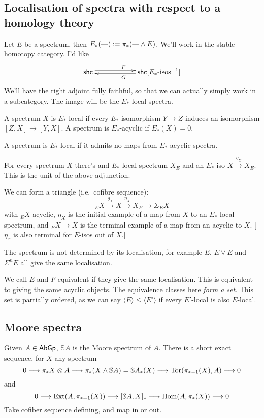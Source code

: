 \documentclass[11pt]{article}
\newcommand{\KanSemResponse}[1]
{
\thispagestyle{fancy}
\section{#1}
}
\begin{document}
\begin{MarkusLocalisationPractice}
\KanSemResponse
{Localisation of spectra with respect to a homology theory}
Let $E$ be a spectrum, then $E_*(\textup{---}):=\pi_*(\textup{---}\wedge E)$. We'll work in the stable homotopy category. I'd like
\[\xymatrix@R=.3cm@C=2cm{
\mathsf{shc}  \ar@<.6ex>[r]^{F}&
\mathsf{shc}[\textup{$E_*$-isos}^{-1}] \ar@<.4ex>[l]^{G}\\
}\]
We'll have the right adjoint fully faithful, so that we can actually simply work in a subcategory. The image will be the $E_*$-local spectra.
\begin{defn*}
A spectrum $X$ is $E_*$-local if every $E_*$-isomorphism $Y\to Z$ induces an isomorphism $[Z,X]\to[Y,X]$. A spectrum is $E_*$-acyclic if $E_*(X)=0$.
\end{defn*}
\begin{lem*}
A spectrum is $E_*$-local if it admits no maps from $E_*$-acyclic spectra.
\end{lem*}
\begin{thm*}
For every spectrum $X$ there's and $E_*$-local spectrum $X_E$ and an $E_*$-iso $X\overset{\eta_X}{\to} X_E$. This is the unit of the above adjunction.
\end{thm*}
We can form a triangle (i.e.\ cofibre sequence):
\[{_E}X\overset{\theta_X}{\to}X\overset{\eta_X}{\to}X_E\to\Sigma{{_E}X}\]
with ${_E}X$ acyclic, $\eta_X$ is the initial example of a map from $X$ to an $E_*$-local spectrum, and $_EX\to X$ is the terminal example of a map from an acyclic to $X$. [$\eta_x$ is also terminal for $E$-isos out of $X$.]

The spectrum is not determined by its localisation, for example $E$, $E\vee E$ and $\Sigma^nE$ all give the same localisation.
\begin{defn*}
We call $E$ and $F$ equivalent if they give the same localisation. This is equivalent to giving the same acyclic objects. The equivalence classes here \emph{form a set}. This set is partially ordered, as we can say $\langle E\rangle\leq\langle E'\rangle$ if every $E'$-local is also $E$-local.
\end{defn*}
\subsection*{Moore spectra}

\begin{exmp*} Given $A\in\operatorname{{\mathsf{AbGp}}}$, $\mathbb{S}A$ is the Moore spectrum of $A$. There is a short exact sequence, for $X$ any spectrum
\[0\longrightarrow\pi_*X\otimes A\longrightarrow\pi_*(X\wedge\mathbb{S}A) =\mathbb{S}A_*(X)\longrightarrow\operatorname{Tor}(\pi_{*-1}(X),A)\longrightarrow0\]
and
\[0\longrightarrow\operatorname{Ext}(A,\pi_{*+1}(X))\longrightarrow[\mathbb{S}A,X]_*\longrightarrow\operatorname{Hom}(A,\pi_*(X))\longrightarrow0\]
Take cofiber sequence defining, and map in or out.


\end{exmp*}
\end{MarkusLocalisationPractice}
\end{document}
